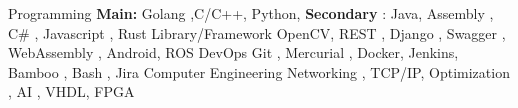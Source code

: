 

\begin{cvskills}

  \cvskill
    {Programming} %
    { \textbf{Main: }Golang ,C/C++, Python, \textbf{Secondary }: Java, Assembly , C\# , Javascript , Rust  } %
  \cvskill
    {Library/Framework } %
    { OpenCV,  REST , Django , Swagger , WebAssembly , Android, ROS } %
  \cvskill
    {DevOps} %
    {Git , Mercurial , Docker, Jenkins, Bamboo , Bash , Jira} %
 \cvskill
    {Computer Engineering } %
    { Networking , TCP/IP, Optimization , AI , VHDL, FPGA } %

\end{cvskills}